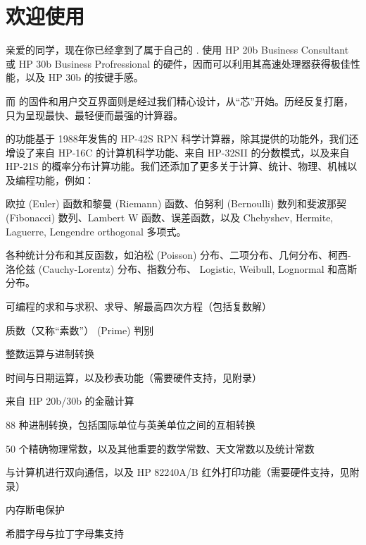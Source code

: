 
\chapter{欢迎使用}

亲爱的同学，现在你已经拿到了属于自己的 \wpx. \wpx 使用 HP 20b Business Consultant 或 HP 30b Business Profressional 的硬件，因而可以利用其高速处理器获得极佳性能，以及 HP 30b 的按键手感。

而 \wpx 的固件和用户交互界面则是经过我们精心设计，从“芯”开始。历经反复打磨，只为呈现最快、最轻便而最强的计算器。

\wpx 的功能基于 1988年发售的 HP-42S RPN 科学计算器，除其提供的功能外，我们还增设了来自 HP-16C 的计算机科学功能、来自 HP-32SII 的分数模式，以及来自 HP-21S 的概率分布计算功能。我们还添加了更多关于计算、统计、物理、机械以及编程功能，例如：

\li

\item 欧拉 (Euler) \beta 函数和黎曼 (Riemann) \zeta 函数、伯努利 (Bernoulli) 数列和斐波那契 (Fibonacci) 数列、Lambert W 函数、误差函数，以及 Chebyshev, Hermite, Laguerre, Lengendre orthogonal 多项式。
\item 各种统计分布和其反函数，如泊松 (Poisson) 分布、二项分布、几何分布、柯西-洛伦兹 (Cauchy-Lorentz) 分布、指数分布、 Logistic, Weibull, Lognormal 和高斯分布。
\item 可编程的求和与求积、求导、解最高四次方程（包括复数解）
\item 质数（又称“素数”） (Prime) 判别
\item 整数运算与进制转换
\item 时间与日期运算，以及秒表功能（需要硬件支持，见附录）
\item 来自 HP 20b/30b 的金融计算
\item 88 种进制转换，包括国际单位与英美单位之间的互相转换
\item 50 个精确物理常数，以及其他重要的数学常数、天文常数以及统计常数
\item 与计算机进行双向通信，以及 HP 82240A/B 红外打印功能（需要硬件支持，见附录）
\item 内存断电保护
\item 希腊字母与拉丁字母集支持

\lix

